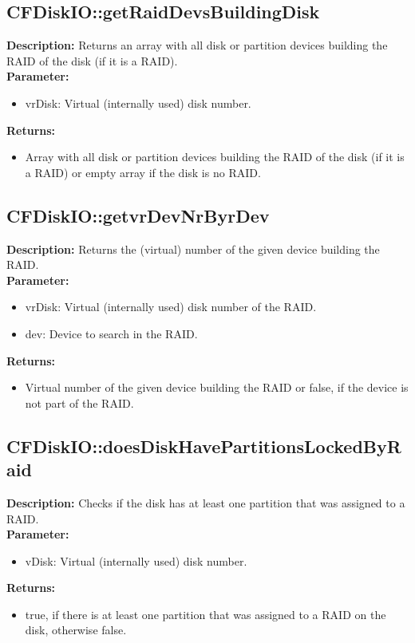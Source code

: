 \subsection{CFDiskIO::getRaidDevsBuildingDisk}
\textbf{Description:} Returns an array with all disk or partition devices building the RAID of the disk (if it is a RAID).\\
\textbf{Parameter:}
\begin{itemize}
\item vrDisk: Virtual (internally used) disk number.
\end{itemize}
\textbf{Returns:}
\begin{itemize}
\item Array with all disk or partition devices building the RAID of the disk (if it is a RAID) or empty array if the disk is no RAID.
\end{itemize}

\subsection{CFDiskIO::getvrDevNrByrDev}
\textbf{Description:} Returns the (virtual) number of the given device building the RAID.\\
\textbf{Parameter:}
\begin{itemize}
\item vrDisk: Virtual (internally used) disk number of the RAID.
\item dev: Device to search in the RAID.
\end{itemize}
\textbf{Returns:}
\begin{itemize}
\item Virtual number of the given device building the RAID or false, if the device is not part of the RAID.
\end{itemize}

\subsection{CFDiskIO::doesDiskHavePartitionsLockedByRaid}
\textbf{Description:} Checks if the disk has at least one partition that was assigned to a RAID.\\
\textbf{Parameter:}
\begin{itemize}
\item vDisk: Virtual (internally used) disk number.
\end{itemize}
\textbf{Returns:}
\begin{itemize}
\item true, if there is at least one partition that was assigned to a RAID on the disk, otherwise false.
\end{itemize}


